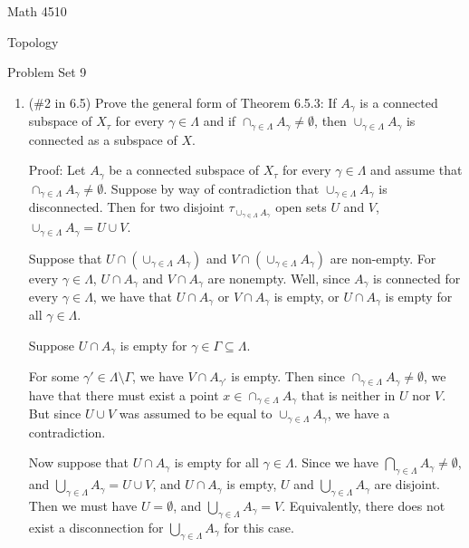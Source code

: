 \documentclass[12pt]{article}
\begin{document}
\noindent Math 4510

\noindent Topology

\vspace{.2in}
\begin{center}
Problem Set 9
\end{center}

 \begin{enumerate}%
 \item (\#2 in 6.5) Prove the general form of Theorem 6.5.3: If $A_{\gamma}$ is a connected subspace of $X_{\tau}$ for every $\gamma\in \Lambda$ and if $\cap_{\gamma\in\Lambda} A_{\gamma}\neq \emptyset$, then $\cup_{\gamma\in\Lambda}A_\gamma$ is connected as a subspace of $X$.
 \newline
 
 Proof: Let $A_{\gamma}$ be a connected subspace of $X_{\tau}$ for every $\gamma \in \Lambda$ and assume that $\cap_{\gamma \in \Lambda} A_{\gamma} \neq \emptyset$. 
 Suppose by way of contradiction that $\cup_{\gamma \in \Lambda} A_{\gamma}$ is disconnected. Then for two disjoint $\tau_{\cup_{\gamma \in \Lambda} A_{\gamma}}$ open sets $U$ and $V$, $\cup_{\gamma \in \Lambda} A_{\gamma} = U \cup V$. 
 
 Suppose that $U \cap (\cup_{\gamma \in \Lambda} A_{\gamma})$ and $V \cap (\cup_{\gamma \in \Lambda} A_{\gamma})$ are non-empty. 
 For every $\gamma \in \Lambda$, $U \cap A_{\gamma}$ and $V \cap A_{\gamma}$ are nonempty. Well, since $A_{\gamma}$ is connected for every $\gamma \in \Lambda$, we have that $U \cap A_{\gamma}$ or $V \cap A_{\gamma}$ is empty, or $U \cap A_{\gamma}$ is empty for all $\gamma \in \Lambda$. 
 
 Suppose $U \cap A_{\gamma}$ is empty for $\gamma \in \Gamma \subseteq \Lambda$.
 
 For some $\gamma' \in \Lambda \setminus \Gamma$, we have $V \cap A_{\gamma'}$ is empty. Then since $\cap_{\gamma \in \Lambda} A_{\gamma} \neq \emptyset$, we have that there must exist a point $x \in \cap_{\gamma \in \Lambda} A_{\gamma}$ that is neither in $U$ nor $V$. 
 But since $U \cup V$ was assumed to be equal to $\cup_{\gamma \in \Lambda} A_{\gamma}$, we have a contradiction.
 
 Now suppose that $U \cap A_{\gamma}$ is empty for all $\gamma \in \Lambda$. Since we have $\bigcap_{\gamma \in \Lambda} A_{\gamma} \neq \emptyset$, and $\bigcup_{\gamma \in \Lambda} A_{\gamma} = U \cup V$, and $U \cap A_{\gamma}$ is empty, $U$ and $\bigcup_{\gamma \in \Lambda} A_{\gamma}$ are disjoint. Then we must have $U = \emptyset$, and $\bigcup_{\gamma \in \Lambda} A_{\gamma} = V$. Equivalently, there does not exist a disconnection for $\bigcup_{\gamma \in \Lambda} A_{\gamma}$ for this case.
 

\end{enumerate}
\end{document}
